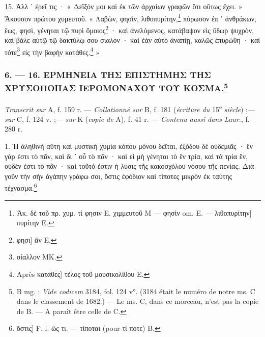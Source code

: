 \documentclass[a4paper, 11pt, oneside, polutonikogreek, french]{article}
\begin{document}
15. Ἀλλ ᾽ ἐρεῖ τις · « Δεῖξόν μοι καὶ ἐκ τῶν ἀρχαίων γραφῶν ὅτι οὕτως ἔχει. » Ἄκουσον πρώτου χυμευτοῦ. « Λαβὼν, φησίν, λιθοπυρίτην,\footnote{Ἄκ. δὲ τοῦ πρ. χυμ. τί φησιν E. χιμμευτοῦ M --- φησὶν om. E. --- λιθοπυρίτην] πυρίτην E.} πύρωσον ἐπ ᾽ ἀνθράκων, ἕως, φησὶ, γένηται τῷ πυρὶ ὅμοιος\footnote{φησι] ἂν E.} · καὶ ἀνελόμενος, κατάβαψον εἰς ὕδωρ ψυχρὸν, καὶ βάλε αὐτῷ τῷ δακτύλῳ σου σίαλον · καὶ ἐὰν αὐτὸ ἀναπίῃ, καλῶς ἐπυρώθη · καὶ τότε\footnote{σίαλλον MK.} εἰς τὴν βαφὴν κατάθες.\footnote{Après κατάθες] τἐλος τοῦ μουσικολίθου E.} »

\bigskip
\centerline{\EightStarTaper}
\centerline{\EightStarTaper\EightStarTaper}
\bigskip

\subsubsection[6. --- 16. ΕΡΜΗΝΕΙΑ ΤΗΣ ΕΠΙΣΤΗΜΗΣ ΤΗΣ ΧΡΥΣΟΠΟΙΙΑΣ ΙΕΡΟΜΟΝΑΧΟΥ ΤΟΥ ΚΟΣΜΑ.]{6. --- 16. ΕΡΜΗΝΕΙΑ ΤΗΣ ΕΠΙΣΤΗΜΗΣ ΤΗΣ ΧΡΥΣΟΠΟΙΙΑΣ ΙΕΡΟΜΟΝΑΧΟΥ ΤΟΥ ΚΟΣΜΑ.\footnote{B mg. : \emph{Vide codicem} 3184, fol. 124 v°. (3184 était le numéro de notre ms. C dans le classement de 1682.) --- Le ms. C, dans ce morceau, n'est pas la copie de B. --- A paraît être celle de C.}}

\emph{Transcrit sur} A, f. 159 r. --- \emph{Collationné sur} B, f. 181 (\emph{écriture du} 15\textsuperscript{e} \emph{siècle}) ;--- \emph{sur} C, f. 124 v. ;--- \emph{sur} Κ (\emph{copie de} A), f. 41 r. --- \emph{Contenu aussi dans Laur.}, f. 280 r.

\bigskip

1. Ἡ ἀληθινὴ αὕτη καὶ μυστικὴ χυμία κόπου μόνου δεῖται, ἐξόδου δέ οὐδεμιᾶς · ἓν γάρ ἐστι τὸ πᾶν, καὶ δι ᾽ οὗ τὸ πᾶν · καὶ εἰ μὴ γένηται τὸ ἓν τρία, καὶ τὰ τρία ἓν, οὐδέν ἐστι τὸ πᾶν · καὶ τοῦτό ἐστιν ἡ λύσις τῆς κακοσχόλου νόσου τῆς πενίας. Διὰ γοῦν τὴν σὴν ἀγάπην γράφω σοι, ὅστις ἐφόδιον καὶ τίποτες μικρὸν ἐκ ταύτης τέχνασμα.\footnote{ὅστις] F. l. ὥς τι. --- τίποται (pour τί ποτε) B.}
\end{document}
